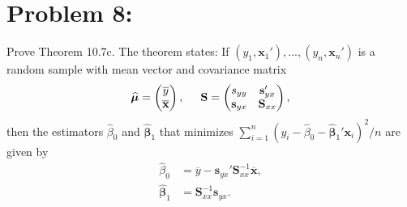 \documentclass[11pt]{article}
\begin{document}
\section*{Problem 8:}
Prove Theorem 10.7c.  The theorem states:  If $(y_1,\mathbf{x}_1'),...,(y_n,\mathbf{x}_n')$ is a random sample with mean vector and covariance matrix
\[
\widehat{\bm\mu} = \left(\begin{matrix}
\overline{y} \\ \overline{\mathbf{x}}
\end{matrix}\right), \hspace{5mm} \mathbf{S} = \left(\begin{matrix}
s_{yy} & \mathbf{s}_{yx}' \\
\mathbf{s}_{yx} & \mathbf{S}_{xx}
\end{matrix}\right),
\]
then the estimators $\widehat{\beta}_0$ and $\widehat{\bm\beta}_1$ that minimizes $\sum_{i=1}^n(y_i - \widehat{\beta}_0 - \widehat{\bm\beta}_1'\mathbf{x}_i)^2 / n$ are given by
\begin{align*}
\widehat{\beta}_0 &= \overline{y} - \mathbf{s}_{yx}'\mathbf{S}_{xx}^{-1}\overline{\mathbf{x}}, \\
\widehat{\bm\beta}_1 &= \mathbf{S}_{xx}^{-1}\mathbf{s}_{yx}.
\end{align*}
\end{document}
